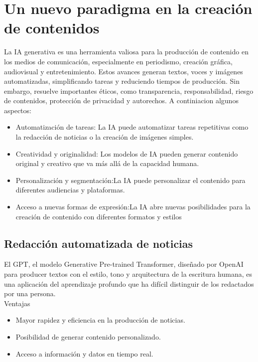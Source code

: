 \documentclass[12pt]{article}
\begin{document}


\section{ Un nuevo paradigma en la creación de contenidos}

La IA generativa es una herramienta valiosa para la producción de contenido en los medios de comunicación, especialmente en periodismo, creación gráfica, audiovisual y entretenimiento. Estos avances generan textos, voces y imágenes automatizadas, simplificando tareas y reduciendo tiempos de producción. Sin embargo, resuelve importantes éticos, como transparencia, responsabilidad, riesgo de contenidos, protección de privacidad y autorechos. A continiacion algunos aspectos:
\begin{itemize}
    \item Automatización de tareas: La IA puede automatizar tareas repetitivas como la redacción de noticias o la creación de imágenes simples.
    \item Creatividad y originalidad: Los modelos de IA pueden generar contenido original y creativo que va más allá de la capacidad humana.
    \item Personalización y segmentación:La IA puede personalizar el contenido para diferentes audiencias y plataformas.
    \item Acceso a nuevas formas de expresión:La IA abre nuevas posibilidades para la creación de contenido con diferentes formatos y estilos
\end{itemize}
\subsection{Redacción automatizada de noticias}

El GPT, el modelo Generative Pre-trained Transformer, diseñado por OpenAI para producer textos con el estilo, tono y arquitectura de la escritura humana, es una aplicación del aprendizaje profundo que ha difícil distinguir de los redactados por una persona.
\\Ventajas
\begin{itemize}
    \item Mayor rapidez y eficiencia en la producción de noticias.
    \item Posibilidad de generar contenido personalizado.
    \item Acceso a información y datos en tiempo real.
\end{itemize}
\end{document}
